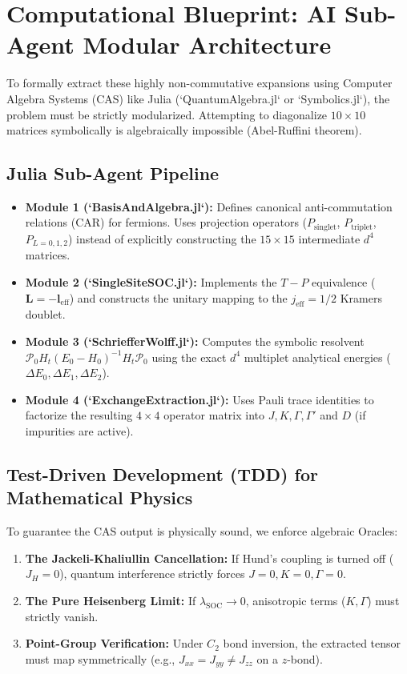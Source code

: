 \documentclass[11pt, a4paper]{article}
\begin{document}
\section{Computational Blueprint: AI Sub-Agent Modular Architecture}

To formally extract these highly non-commutative expansions using Computer Algebra Systems (CAS) like Julia (`QuantumAlgebra.jl` or `Symbolics.jl`), the problem must be strictly modularized. Attempting to diagonalize $10 \times 10$ matrices symbolically is algebraically impossible (Abel-Ruffini theorem). 

\subsection{Julia Sub-Agent Pipeline}
\begin{itemize}
    \item \textbf{Module 1 (`BasisAndAlgebra.jl`):} Defines canonical anti-commutation relations (CAR) for fermions. Uses projection operators ($P_{\text{singlet}}$, $P_{\text{triplet}}$, $P_{L=0,1,2}$) instead of explicitly constructing the $15 \times 15$ intermediate $d^4$ matrices.
    \item \textbf{Module 2 (`SingleSiteSOC.jl`):} Implements the $T-P$ equivalence ($\bm{L} = -\bm{l}_{\text{eff}}$) and constructs the unitary mapping to the $j_{\text{eff}}=1/2$ Kramers doublet.
    \item \textbf{Module 3 (`SchriefferWolff.jl`):} Computes the symbolic resolvent $\mathcal{P}_0 H_t (E_0 - H_0)^{-1} H_t \mathcal{P}_0$ using the exact $d^4$ multiplet analytical energies ($\Delta E_0, \Delta E_1, \Delta E_2$). 
    \item \textbf{Module 4 (`ExchangeExtraction.jl`):} Uses Pauli trace identities to factorize the resulting $4 \times 4$ operator matrix into $J, K, \Gamma, \Gamma'$ and $D$ (if impurities are active).
\end{itemize}

\subsection{Test-Driven Development (TDD) for Mathematical Physics}
To guarantee the CAS output is physically sound, we enforce algebraic Oracles:
\begin{enumerate}
    \item \textbf{The Jackeli-Khaliullin Cancellation:} If Hund's coupling is turned off ($J_H = 0$), quantum interference strictly forces $J=0, K=0, \Gamma=0$.
    \item \textbf{The Pure Heisenberg Limit:} If $\lambda_{\text{SOC}} \to 0$, anisotropic terms ($K, \Gamma$) must strictly vanish.
    \item \textbf{Point-Group Verification:} Under $C_2$ bond inversion, the extracted tensor must map symmetrically (e.g., $J_{xx} = J_{yy} \neq J_{zz}$ on a $z$-bond).
\end{enumerate}
\end{document}
